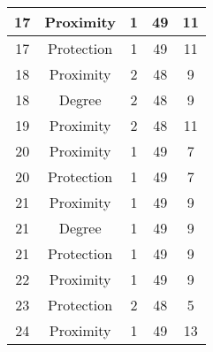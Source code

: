 \documentclass[results.tex]{subfiles}
\begin{document}
\begin{center}
\begin{tabular}{| c || c | c | c | c |}
            \hline
            17                      & Proximity                    & 1                      & 49                      & 11                   \\
            \hline
            17                      & Protection                   & 1                      & 49                      & 11                   \\
            \hline
            18                      & Proximity                    & 2                      & 48                      & 9                    \\
            \hline
            18                      & Degree                       & 2                      & 48                      & 9                    \\
            \hline
            19                      & Proximity                    & 2                      & 48                      & 11                   \\
            \hline
            20                      & Proximity                    & 1                      & 49                      & 7                    \\
            \hline
            20                      & Protection                   & 1                      & 49                      & 7                    \\
            \hline
            21                      & Proximity                    & 1                      & 49                      & 9                    \\
            \hline
            21                      & Degree                       & 1                      & 49                      & 9                    \\
            \hline
            21                      & Protection                   & 1                      & 49                      & 9                    \\
            \hline
            22                      & Proximity                    & 1                      & 49                      & 9                    \\
            \hline
            23                      & Protection                   & 2                      & 48                      & 5                    \\
            \hline
            24                      & Proximity                    & 1                      & 49                      & 13                   \\

\end{tabular}
\end{center}
\end{document}
